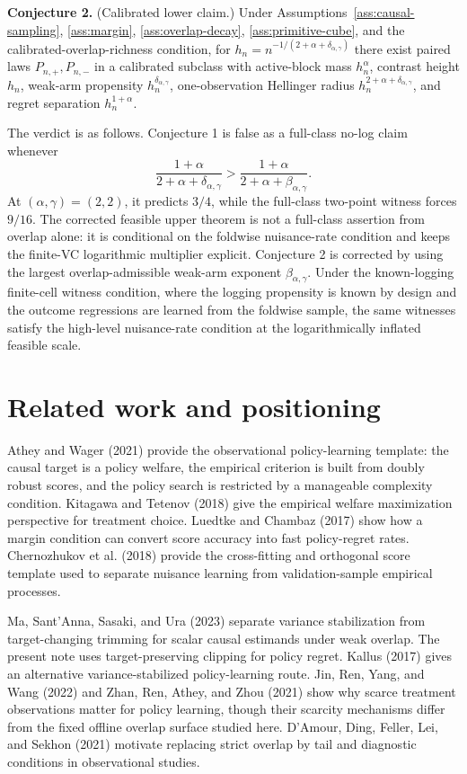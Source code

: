 \documentclass[11pt]{article}
\theoremstyle{definition}
\theoremstyle{plain}
\theoremstyle{remark}
\begin{document}
\textbf{Conjecture 2.} (Calibrated lower claim.) Under
Assumptions~\ref{ass:causal-sampling}, \ref{ass:margin},
\ref{ass:overlap-decay}, \ref{ass:primitive-cube}, and the
calibrated-overlap-richness condition, for
\(h_n=n^{-1/(2+\alpha+\delta_{\alpha,\gamma})}\) there exist paired laws
\(P_{n,+},P_{n,-}\) in a calibrated subclass with active-block mass
\(h_n^\alpha\), contrast height \(h_n\), weak-arm propensity
\(h_n^{\delta_{\alpha,\gamma}}\), one-observation Hellinger radius
\(h_n^{2+\alpha+\delta_{\alpha,\gamma}}\), and regret separation
\(h_n^{1+\alpha}\).

The verdict is as follows.  Conjecture 1 is false as a full-class no-log
claim whenever
\[
\frac{1+\alpha}{2+\alpha+\delta_{\alpha,\gamma}}
>
\frac{1+\alpha}{2+\alpha+\beta_{\alpha,\gamma}}.
\]
At \((\alpha,\gamma)=(2,2)\), it predicts \(3/4\), while the full-class
two-point witness forces \(9/16\).  The corrected feasible upper theorem is
not a full-class assertion from overlap alone: it is conditional on the
foldwise nuisance-rate condition and keeps the finite-VC logarithmic
multiplier explicit.  Conjecture 2 is corrected by using the largest
overlap-admissible weak-arm exponent \(\beta_{\alpha,\gamma}\).  Under the
known-logging finite-cell witness condition, where the logging propensity is
known by design and the outcome regressions are learned from the foldwise
sample, the same witnesses satisfy the high-level nuisance-rate condition at
the logarithmically inflated feasible scale.

\section{Related work and positioning}
Athey and Wager (2021) provide the observational policy-learning template:
the causal target is a policy welfare, the empirical criterion is built from
doubly robust scores, and the policy search is restricted by a manageable
complexity condition.  Kitagawa and Tetenov (2018) give the empirical welfare
maximization perspective for treatment choice.  Luedtke and Chambaz (2017)
show how a margin condition can convert score accuracy into fast policy-regret
rates.  Chernozhukov et al. (2018) provide the cross-fitting and orthogonal
score template used to separate nuisance learning from validation-sample
empirical processes.

Ma, Sant'Anna, Sasaki, and Ura (2023) separate variance stabilization from
target-changing trimming for scalar causal estimands under weak overlap.  The
present note uses target-preserving clipping for policy regret.  Kallus
(2017) gives an alternative variance-stabilized policy-learning route.  Jin,
Ren, Yang, and Wang (2022) and Zhan, Ren, Athey, and Zhou (2021) show why
scarce treatment observations matter for policy learning, though their
scarcity mechanisms differ from the fixed offline overlap surface studied
here.  D'Amour, Ding, Feller, Lei, and Sekhon (2021) motivate replacing
strict overlap by tail and diagnostic conditions in observational studies.
\end{document}
